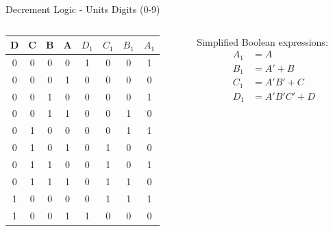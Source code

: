\documentclass{beamer}
\begin{document}
\begin{frame}{Decrement Logic - Units Digits (0-9)}
    \begin{columns}
        \begin{column}{0.5\textwidth}
            \begin{table}
                \centering
                \scriptsize
                \begin{tabular}{|c|c|c|c|c|c|c|c|}
                \hline
                D & C & B & A & $D_1$ & $C_1$ & $B_1$ & $A_1$ \\ 
                \hline
                0 & 0 & 0 & 0 & 1 & 0 & 0 & 1 \\
                0 & 0 & 0 & 1 & 0 & 0 & 0 & 0 \\
                0 & 0 & 1 & 0 & 0 & 0 & 0 & 1 \\
                0 & 0 & 1 & 1 & 0 & 0 & 1 & 0 \\
                0 & 1 & 0 & 0 & 0 & 0 & 1 & 1 \\
                0 & 1 & 0 & 1 & 0 & 1 & 0 & 0 \\
                0 & 1 & 1 & 0 & 0 & 1 & 0 & 1 \\
                0 & 1 & 1 & 1 & 0 & 1 & 1 & 0 \\
                1 & 0 & 0 & 0 & 0 & 1 & 1 & 1 \\
                1 & 0 & 0 & 1 & 1 & 0 & 0 & 0 \\
                \hline
                \end{tabular}
            \end{table}
        \end{column}
        \begin{column}{0.5\textwidth}
            Simplified Boolean expressions:
            \begin{align*}
                A_1 &= A \\
                B_1 &= A' + B \\
                C_1 &= A'B' + C \\
                D_1 &= A'B'C' + D
            \end{align*}
        \end{column}
    \end{columns}
\end{frame}
\end{document}
